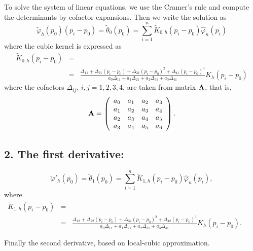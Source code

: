 \documentclass[preprint,12pt]{elsarticle}
\begin{document}
To solve the system of linear equations, we use the Cramer's rule and compute the determinants by cofactor expansions. Then we write the solution as
\begin{equation}\label{phi.cub}
\widetilde{\varphi}_h(p_0)\left(p_i-p_0\right)= \widetilde{\theta}_0(p_0)=\sum_{i=1}^n \widetilde{K}_{0,h}\left(p_i-p_0\right) \widehat{\varphi}_n\left(p_i\right)
\end{equation}
where the cubic kernel is expressed as
\begin{eqnarray*}
\widetilde{K}_{0,h}\left(p_i-p_0\right)&=& \\
&=&\frac{\Delta_{11}+\Delta_{21}\left(p_i-p_0 \right)+\Delta_{31}\left(p_i-p_0 \right)^2+\Delta_{41}\left(p_i-p_0 \right)^3}{a_0 \Delta_{11}+ a_1 \Delta_{21}+a_2 \Delta_{31}+a_3 \Delta_{41}} K_h\left(p_i-p_0\right)
\end{eqnarray*}
where the cofactors $\Delta_{ij}$, $i,j=1, 2, 3, 4$, are taken from matrix ${\bf A}$, that is,
\[
{\bf A} =\left(\begin{array}{cccc}
a_0 & a_1&a_2 &a_3 \\ 
a_{1} & a_2&a_3 &a_{4}\\
a_2 & a_3 &a_4 &a_5 \\ 
a_3 & a_4&a_5 &a_{6} 
\end{array}\right).
\]


 

\subsection*{2. The first derivative:} %
\begin{equation}\label{dphi.cub}
\widetilde{\varphi}'_h(p_0)=\widetilde{\theta}_1(p_0)= \sum_{i=1}^n \widetilde{K}_{1,h}\left(p_i-p_0\right) \widehat{\varphi}_n\left(p_i\right),
\end{equation}
where
\begin{eqnarray*}
\widetilde{K}_{1,h}\left(p_i-p_0\right)&=& \\
&=&\frac{\Delta_{12}+\Delta_{22}\left(p_i-p_0 \right)+\Delta_{32}\left(p_i-p_0 \right)^2+\Delta_{42}\left(p_i-p_0 \right)^3}{a_0 \Delta_{11}+ a_1 \Delta_{21}+a_2 \Delta_{31}+a_3 \Delta_{41}}  K_h\left(p_i-p_0\right). \qquad
\end{eqnarray*}


Finally the second derivative, based on local-cubic approximation.
\end{document}
